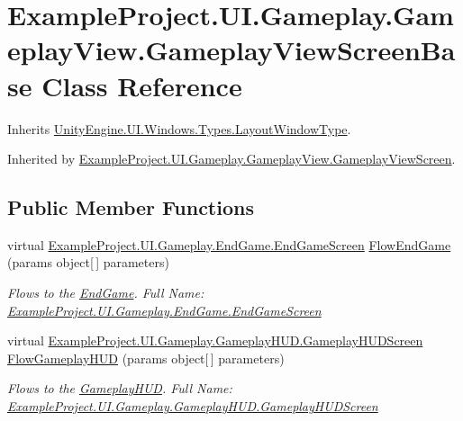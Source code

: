\hypertarget{class_example_project_1_1_u_i_1_1_gameplay_1_1_gameplay_view_1_1_gameplay_view_screen_base}{}\section{Example\+Project.\+U\+I.\+Gameplay.\+Gameplay\+View.\+Gameplay\+View\+Screen\+Base Class Reference}
\label{class_example_project_1_1_u_i_1_1_gameplay_1_1_gameplay_view_1_1_gameplay_view_screen_base}


Inherits \hyperlink{class_unity_engine_1_1_u_i_1_1_windows_1_1_types_1_1_layout_window_type}{Unity\+Engine.\+U\+I.\+Windows.\+Types.\+Layout\+Window\+Type}.



Inherited by \hyperlink{class_example_project_1_1_u_i_1_1_gameplay_1_1_gameplay_view_1_1_gameplay_view_screen}{Example\+Project.\+U\+I.\+Gameplay.\+Gameplay\+View.\+Gameplay\+View\+Screen}.

\subsection*{Public Member Functions}
\begin{DoxyCompactItemize}
\item 
virtual \hyperlink{class_example_project_1_1_u_i_1_1_gameplay_1_1_end_game_1_1_end_game_screen}{Example\+Project.\+U\+I.\+Gameplay.\+End\+Game.\+End\+Game\+Screen} \hyperlink{class_example_project_1_1_u_i_1_1_gameplay_1_1_gameplay_view_1_1_gameplay_view_screen_base_a40b20c80d7bcbb9b8bd4dd737ef32042}{Flow\+End\+Game} (params object\mbox{[}$\,$\mbox{]} parameters)
\begin{DoxyCompactList}\small\item\em Flows to the \hyperlink{namespace_example_project_1_1_u_i_1_1_gameplay_1_1_end_game}{End\+Game}. Full Name\+: \hyperlink{class_example_project_1_1_u_i_1_1_gameplay_1_1_end_game_1_1_end_game_screen}{Example\+Project.\+U\+I.\+Gameplay.\+End\+Game.\+End\+Game\+Screen} \end{DoxyCompactList}\item 
virtual \hyperlink{class_example_project_1_1_u_i_1_1_gameplay_1_1_gameplay_h_u_d_1_1_gameplay_h_u_d_screen}{Example\+Project.\+U\+I.\+Gameplay.\+Gameplay\+H\+U\+D.\+Gameplay\+H\+U\+D\+Screen} \hyperlink{class_example_project_1_1_u_i_1_1_gameplay_1_1_gameplay_view_1_1_gameplay_view_screen_base_aed4374c8619219fa3a19022f83c21080}{Flow\+Gameplay\+H\+U\+D} (params object\mbox{[}$\,$\mbox{]} parameters)
\begin{DoxyCompactList}\small\item\em Flows to the \hyperlink{namespace_example_project_1_1_u_i_1_1_gameplay_1_1_gameplay_h_u_d}{Gameplay\+H\+U\+D}. Full Name\+: \hyperlink{class_example_project_1_1_u_i_1_1_gameplay_1_1_gameplay_h_u_d_1_1_gameplay_h_u_d_screen}{Example\+Project.\+U\+I.\+Gameplay.\+Gameplay\+H\+U\+D.\+Gameplay\+H\+U\+D\+Screen} \end{DoxyCompactList}\end{DoxyCompactItemize}
